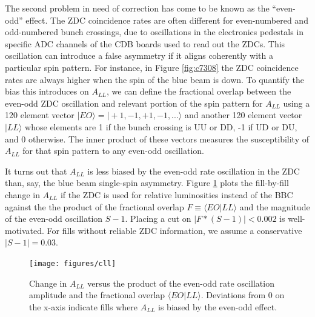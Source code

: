 
The second problem in need of correction has come to be known as the
``even-odd'' effect.  The ZDC coincidence rates are often
different for even-numbered and odd-numbered bunch crossings, due to
oscillations in the electronics pedestals in specific ADC channels of the CDB
boards used to read out the ZDCs. This oscillation can introduce a false
asymmetry if it aligns coherently with a particular spin pattern. For instance,
in Figure \ref{fig:c7308} the ZDC coincidence rates are always higher when the
spin of the blue beam is down.  To quantify the bias this introduces on $A_{LL}$, we can
define the fractional overlap between the even-odd ZDC oscillation and relevant
portion of the spin pattern for $A_{LL}$ using a 120 element vector $|EO\rangle
= |+1,-1,+1,-1,...\rangle$ and another 120 element vector $|LL\rangle$ whose
elements are 1 if the bunch crossing is UU or DD, -1 if UD or DU, and 0
otherwise. The inner product of these vectors measures the susceptibility of
$A_{LL}$ for that spin pattern to any even-odd oscillation.


It turns out that $A_{LL}$ is less biased by the even-odd rate oscillation in
the ZDC than, say, the blue beam single-spin asymmetry. Figure \ref{fig:cll}
plots the fill-by-fill change in $A_{LL}$ if the ZDC is used for relative
luminosities instead of the BBC against the the product of the fractional
overlap $F \equiv \langle EO | LL \rangle$ and the magnitude of the even-odd
oscillation $S-1$. Placing a cut on $|F*(S-1)| < 0.002$ is well-motivated. For
fills without reliable ZDC information, we assume a conservative $|S-1| = 0.03$.

\begin{figure}
  \begin{center}
  \texttt{[image: figures/cll]}
  \end{center}
  \caption{Change in $A_{LL}$ versus the product of the even-odd rate oscillation amplitude and the fractional overlap $\langle EO | LL \rangle$.  Deviations from 0 on the x-axis indicate fills where $A_{LL}$ is biased by the even-odd effect.}
  \label{fig:cll}
\end{figure}

